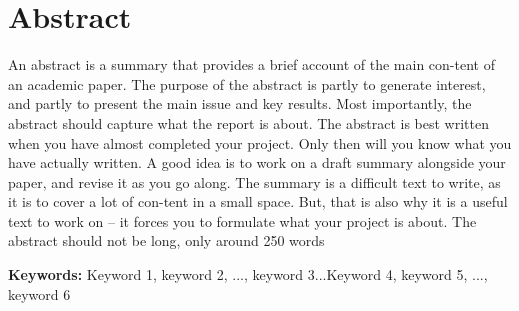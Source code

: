 \section*{Abstract}
An  abstract  is  a  summary  that provides  a brief  account of  the  main con-tent  of  an  academic  paper. The purpose of the abstract is partly to generate interest, and partly to present the main  issue and key results. Most importantly, the abstract should capture what the report is about.  
The abstract is best written when you have almost completed your project. Only then will you  know what you have actually written. A good idea is to work on a draft summary alongside your  paper, and revise it as you go along. The summary is a difficult text to write, as it is to cover a  lot of con-tent in a small space. But, that is also why it is a useful text to work on – it forces you  to  formulate  what  your  project  is  about.  The  abstract  should  not  be  long,  only  around  250   words

\vspace{.5cm}

\textbf{Keywords:} Keyword 1, keyword 2, ..., keyword 3...Keyword 4, keyword 5, ..., keyword 6
\newpage